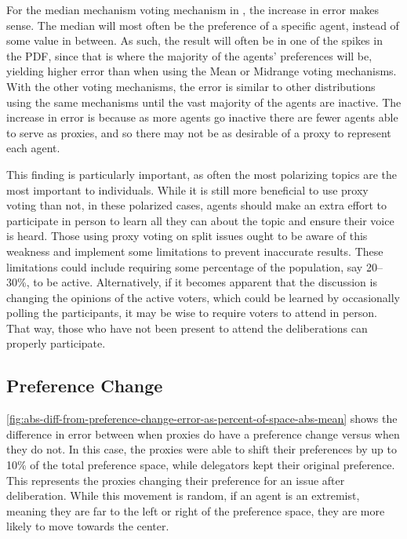For the median mechanism voting mechanism in ,
the increase in error makes sense.
The median will most often be the preference of a specific agent, instead of some
value in between.
As such, the result will often be in one of the spikes in the PDF, since that is
where the majority of the agents' preferences will be, yielding higher error than when
using the Mean or Midrange voting mechanisms.
With the other voting mechanisms, the error is similar to other distributions using
the same mechanisms until the vast majority of the agents are inactive.
The increase in error is because as more agents go inactive there are fewer agents able
to serve as proxies, and so there may not be as desirable of a proxy to represent
each agent.

This finding is particularly important, as often the most polarizing topics are the
most important to individuals.
While it is still more beneficial to use proxy voting than not, in these polarized
cases, agents should make an extra effort to participate in person to learn all they
can about the topic and ensure their voice is heard.
Those using proxy voting on split issues ought to be aware of this weakness and
implement some limitations to prevent inaccurate results.
These limitations could include requiring some percentage of the population, say
20--30\%, to be active.
Alternatively, if it becomes apparent that the discussion is changing the opinions of
the active voters, which could be learned by occasionally polling the participants, it
may be wise to require voters to attend in person.
That way, those who have not been present to attend the deliberations can properly
participate.

\subsection{Preference Change}\label{subsec:results-shift}
\autoref{fig:abs-diff-from-preference-change-error-as-percent-of-space-abs-mean} shows
the difference in error between when proxies do have a preference change versus when
they do not.
In this case, the proxies were able to shift their preferences by up to 10\% of the
total preference space, while delegators kept their original preference.
This represents the proxies changing their preference for an issue after deliberation.
While this movement is random, if an agent is an extremist, meaning they are far to the
left or right of the preference space, they are more likely to move towards the center.

